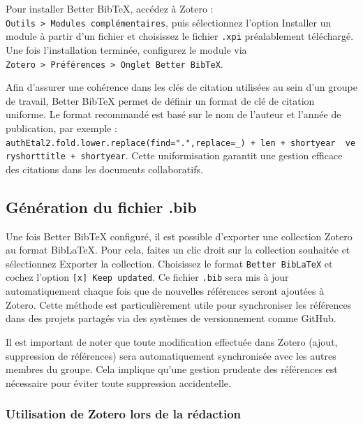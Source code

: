 \documentclass[
  letterpaper,
  DIV=11,
  numbers=noendperiod]{scrreprt}
\begin{document}
Pour installer Better BibTeX, accédez à Zotero :
\texttt{Outils\ \textgreater{}\ Modules\ complémentaires}, puis
sélectionnez l'option Installer un module à partir d'un fichier et
choisissez le fichier \texttt{.xpi} préalablement téléchargé. Une fois
l'installation terminée, configurez le module via
\texttt{Zotero\ \textgreater{}\ Préférences\ \textgreater{}\ Onglet\ Better\ BibTeX}.

Afin d'assurer une cohérence dans les clés de citation utilisées au sein
d'un groupe de travail, Better BibTeX permet de définir un format de clé
de citation uniforme. Le format recommandé est basé sur le nom de
l'auteur et l'année de publication, par exemple :
\texttt{authEtal2.fold.lower.replace(find=".",replace=\_)\ +\ len\ +\ shortyear\ \textbar{}\ veryshorttitle\ +\ shortyear}.
Cette uniformisation garantit une gestion efficace des citations dans
les documents collaboratifs.

\hypertarget{guxe9nuxe9ration-du-fichier-.bib}{%
\subsection{Génération du fichier
.bib}\label{guxe9nuxe9ration-du-fichier-.bib}}

Une fois Better BibTeX configuré, il est possible d'exporter une
collection Zotero au format BibLaTeX. Pour cela, faites un clic droit
sur la collection souhaitée et sélectionnez Exporter la collection.
Choisissez le format \texttt{Better\ BibLaTeX} et cochez l'option
\texttt{{[}x{]}\ Keep\ updated}. Ce fichier \texttt{.bib} sera mis à
jour automatiquement chaque fois que de nouvelles références seront
ajoutées à Zotero. Cette méthode est particulièrement utile pour
synchroniser les références dans des projets partagés via des systèmes
de versionnement comme GitHub.

Il est important de noter que toute modification effectuée dans Zotero
(ajout, suppression de références) sera automatiquement synchronisée
avec les autres membres du groupe. Cela implique qu'une gestion prudente
des références est nécessaire pour éviter toute suppression
accidentelle.

\hypertarget{utilisation-de-zotero-lors-de-la-ruxe9daction}{%
\subsubsection{Utilisation de Zotero lors de la
rédaction}\label{utilisation-de-zotero-lors-de-la-ruxe9daction}}
\end{document}
